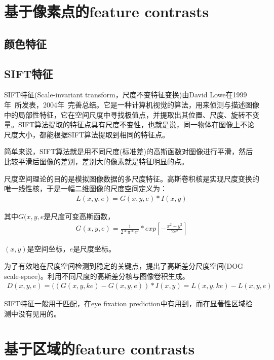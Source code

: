 \documentclass[12pt]{article}
\begin{document}
\section{基于像素点的feature contrasts}

\subsection{颜色特征}

\subsection{SIFT特征}

SIFT特征(Scale-invariant transform，尺度不变特征变换)由David Lowe在1999年~\cite{lowe1999object}所发表，2004年~\cite{lowe2004distinctive}完善总结。它是一种计算机视觉的算法，用来侦测与描述图像中的局部性特征，它在空间尺度中寻找极值点，并提取出其位置、尺度、旋转不变量。SIFT算法提取的特征点具有尺度不变性，也就是说，同一物体在图像上不论尺度大小，都能根据SIFT算法提取到相同的特征点。

简单来说，SIFT算法就是用不同尺度(标准差)的高斯函数对图像进行平滑，然后比较平滑后图像的差别，差别大的像素就是特征明显的点。

尺度空间理论的目的是模拟图像数据的多尺度特征。高斯卷积核是实现尺度变换的唯一线性核，于是一幅二维图像的尺度空间定义为：
\begin{align}
L(x, y, e) = G(x, y, e) * I(x, y)
\end{align}

其中$G(x, y, e$是尺度可变高斯函数，
\begin{align}
 G(x,y,e) = \frac{1}{2*\pi *e^2} * exp[-\frac{x^2 + y^2}{2e^2}]
\end{align}

$(x, y)$是空间坐标，$e$是尺度坐标。

为了有效地在尺度空间检测到稳定的关键点，提出了高斯差分尺度空间(DOG scale-space)。利用不同尺度的高斯差分核与图像卷积生成。
\begin{align}
D(x,y,e) = ((G(x,y,ke) - G(x,y,e)) * I(x,y) = L(x,y,ke) - L(x,y,e)
\end{align}

SIFT特征一般用于匹配，在eye fixation prediction中有用到，而在显著性区域检测中没有见用的。

\section{基于区域的feature contrasts}
\end{document}
